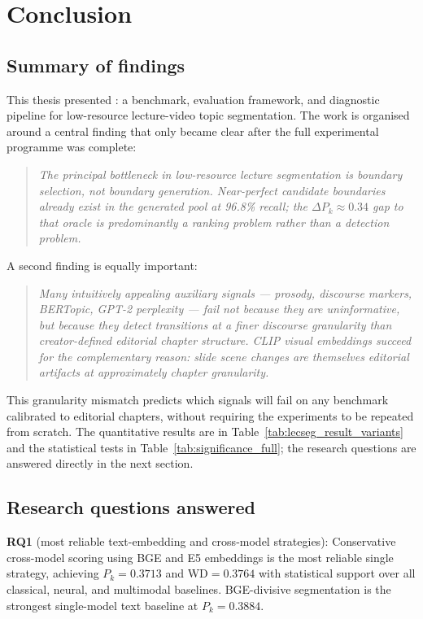 \chapter{Conclusion}
\label{chap:conclusion}

\section{Summary of findings}

This thesis presented \lecseg{}: a benchmark, evaluation framework, and
diagnostic pipeline for low-resource lecture-video topic segmentation.
The work is organised around a central finding that only became clear after
the full experimental programme was complete:

\begin{quote}
\emph{The principal bottleneck in low-resource lecture segmentation is
boundary selection, not boundary generation.
Near-perfect candidate boundaries already exist in the generated pool at
96.8\% recall; the $\Delta P_k \approx 0.34$ gap to that oracle is
predominantly a ranking problem rather than a detection problem.}
\end{quote}

A second finding is equally important:

\begin{quote}
\emph{Many intuitively appealing auxiliary signals --- prosody, discourse
markers, BERTopic, GPT-2 perplexity --- fail not because they are
uninformative, but because they detect transitions at a finer discourse
granularity than creator-defined editorial chapter structure.
CLIP visual embeddings succeed for the complementary reason: slide scene
changes are themselves editorial artifacts at approximately chapter granularity.}
\end{quote}

This granularity mismatch predicts which signals will fail on any benchmark
calibrated to editorial chapters, without requiring the experiments to be
repeated from scratch.
The quantitative results are in Table~\ref{tab:lecseg_result_variants} and
the statistical tests in Table~\ref{tab:significance_full}; the research
questions are answered directly in the next section.

\section{Research questions answered}
\label{sec:rqs_answered}

\textbf{RQ1} (most reliable text-embedding and cross-model strategies):
Conservative cross-model scoring using BGE and E5 embeddings is the most
reliable single strategy, achieving $P_k=0.3713$ and WD$=0.3764$ with
statistical support over all classical, neural, and multimodal baselines.
BGE-divisive segmentation is the strongest single-model text baseline
at $P_k=0.3884$.

